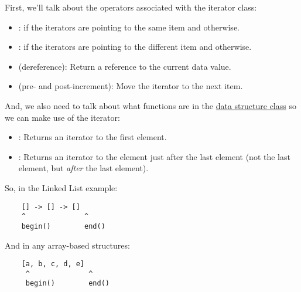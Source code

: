 \documentclass[letterpaper]{article}
\begin{document}
\bigskip 

First, we'll talk about the operators associated with the iterator class: 
\begin{itemize}
    \item \code{==}:  if the iterators are pointing to the same item and  otherwise. 
    \item \code{!=}:  if the iterators are pointing to the different item and  otherwise. 
    \item \code{*} (dereference): Return a reference to the current data value. 
    \item \code{++} (pre- and post-increment): Move the iterator to the next item. 
\end{itemize}

And, we also need to talk about what functions are in the \underline{data structure class} so we can make use of the iterator:
\begin{itemize}
    \item {}: Returns an iterator to the first element. 
    \item {}: Returns an iterator to the element just after the last element (not the last element, but \emph{after} the last element).  
\end{itemize}
So, in the Linked List example: 
\begin{verbatim}
    [] -> [] -> []
    ^              ^
    begin()        end()
\end{verbatim}
And in any array-based structures: 
\begin{verbatim}
    [a, b, c, d, e]
     ^              ^
     begin()        end()
\end{verbatim}
\end{document}
